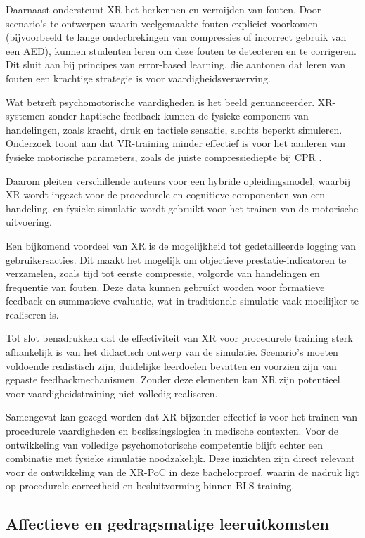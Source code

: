 Daarnaast ondersteunt XR het herkennen en vermijden van fouten. Door scenario’s te ontwerpen waarin veelgemaakte fouten expliciet voorkomen (bijvoorbeeld te lange onderbrekingen van compressies of incorrect gebruik van een AED), kunnen studenten leren om deze fouten te detecteren en te corrigeren. Dit sluit aan bij principes van error-based learning, die aantonen dat leren van fouten een krachtige strategie is voor vaardigheidsverwerving.

Wat betreft psychomotorische vaardigheden is het beeld genuanceerder. XR-systemen zonder haptische feedback kunnen de fysieke component van handelingen, zoals kracht, druk en tactiele sensatie, slechts beperkt simuleren. Onderzoek toont aan dat VR-training minder effectief is voor het aanleren van fysieke motorische parameters, zoals de juiste compressiediepte bij CPR \autocite{Alaker2016VR}. 

Daarom pleiten verschillende auteurs voor een hybride opleidingsmodel, waarbij XR wordt ingezet voor de procedurele en cognitieve componenten van een handeling, en fysieke simulatie wordt gebruikt voor het trainen van de motorische uitvoering.

Een bijkomend voordeel van XR is de mogelijkheid tot gedetailleerde logging van gebruikersacties. Dit maakt het mogelijk om objectieve prestatie-indicatoren te verzamelen, zoals tijd tot eerste compressie, volgorde van handelingen en frequentie van fouten. Deze data kunnen gebruikt worden voor formatieve feedback en summatieve evaluatie, wat in traditionele simulatie vaak moeilijker te realiseren is.

Tot slot benadrukken \textcite{Radianti2020VRHE} dat de effectiviteit van XR voor procedurele training sterk afhankelijk is van het didactisch ontwerp van de simulatie. Scenario’s moeten voldoende realistisch zijn, duidelijke leerdoelen bevatten en voorzien zijn van gepaste feedbackmechanismen. Zonder deze elementen kan XR zijn potentieel voor vaardigheidstraining niet volledig realiseren.

Samengevat kan gezegd worden dat XR bijzonder effectief is voor het trainen van procedurele vaardigheden en beslissingslogica in medische contexten. Voor de ontwikkeling van volledige psychomotorische competentie blijft echter een combinatie met fysieke simulatie noodzakelijk. Deze inzichten zijn direct relevant voor de ontwikkeling van de XR-PoC in deze bachelorproef, waarin de nadruk ligt op procedurele correctheid en besluitvorming binnen BLS-training.

\subsection{Affectieve en gedragsmatige leeruitkomsten}

